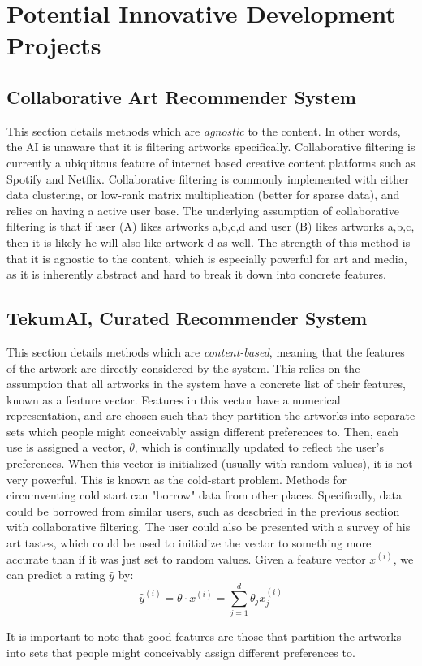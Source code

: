 \documentclass[fontsize=12pt]{scrartcl} %
\numberwithin{equation}{section} %
\numberwithin{figure}{section} %
\numberwithin{table}{section} %
\begin{document}
\section{Potential Innovative Development Projects}
\subsection{Collaborative Art Recommender System}
 This section details methods which are \textit{agnostic} to the content. In other words, the AI is unaware that it is filtering artworks specifically. Collaborative filtering is currently a ubiquitous feature of internet based creative content platforms such as Spotify and Netflix. Collaborative filtering is commonly implemented with either data clustering, or low-rank matrix multiplication (better for sparse data), and relies on having a active user base. The underlying assumption of collaborative filtering is that if user (A) likes artworks {a,b,c,d} and user (B) likes artworks {a,b,c}, then it is likely he will also like artwork {d} as well. The strength of this method is that it is agnostic to the content, which is especially powerful for art and media, as it is inherently abstract and hard to break it down into concrete features.

\subsection{TekumAI, Curated Recommender System}
 This section details methods which are \textit{content-based}, meaning that the features of the artwork are directly considered by the system. This relies on the assumption that all artworks in the system have a concrete list of their features, known as a feature vector. Features in this vector have a numerical representation, and are chosen such that they partition the artworks into separate sets which people might conceivably assign different preferences to. Then, each use is assigned a vector, $\theta$, which is continually updated to reflect the user's preferences. When this vector is initialized (usually with random values), it is not very powerful. This is known as the cold-start problem. Methods for circumventing cold start can "borrow" data from other places. Specifically, data could be borrowed from similar users, such as descbried in the previous section with collaborative filtering. The user could also be presented with a survey of his art tastes, which could be used to initialize the vector to something more accurate than if it was just set to random values. Given a feature vector $x^{(i)}$, we can predict a rating $\hat{y}$ by:
 $$ \hat{y}^{(i)} = \theta \cdot x^{(i)} = \sum_{j=1}^d \theta_jx^{(i)}_j $$

It is important to note that good features are those that partition the artworks into sets that people might
conceivably assign different preferences to.
\end{document}
